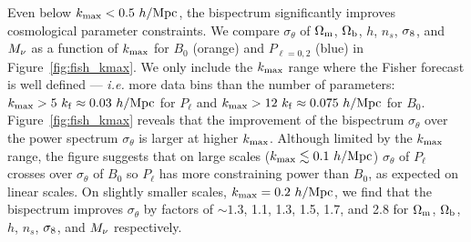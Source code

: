 Even below $k_{\rm max} < 0.5~h/{\rm Mpc}$, the bispectrum significantly 
improves cosmological parameter constraints. We compare $\sigma_\theta$ 
of $\Omega_{\rm m}$, $\Omega_{\rm b}$, $h$, $n_s$, $\sigma_8$, and $M_\nu$ as a function of $k_{\rm max}$ 
for $B_0$ (orange) and $P_{\ell = 0,2}$ (blue) in Figure~\ref{fig:fish_kmax}. We only 
include the $k_{\rm max}$ range where the Fisher forecast is well defined --- 
\emph{i.e.} more data bins than the number of parameters: $k_{\rm max} > 5~k_{\rm f} \approx 0.03~h/{\rm Mpc}$ 
for $P_\ell$ and $k_{\rm max} > 12~k_{\rm f} \approx 0.075~h/{\rm Mpc}$ for 
$B_0$. Figure~\ref{fig:fish_kmax} reveals that the improvement of the
bispectrum $\sigma_\theta$ over the power spectrum $\sigma_\theta$ is 
larger at higher $k_{\rm max}$. Although limited by the $k_{\rm max}$ range, 
the figure suggests that on large scales ($k_{\rm max}\lesssim 0.1~h/{\rm Mpc}$) 
$\sigma_\theta$ of $P_\ell$ crosses over $\sigma_\theta$ of $B_0$ so $P_\ell$ has more 
constraining power than $B_0$, as expected on linear scales. On slightly smaller 
scales, $k_{\rm max} = 0.2~h/{\rm Mpc}$, we find that the bispectrum improves 
$\sigma_\theta$ by factors of 
$\sim 1.3$, 1.1, 1.3, 1.5, 1.7, and 2.8 for $\Omega_{\rm m}$, $\Omega_{\rm b}$, $h$, $n_s$, $\sigma_8$, 
and $M_\nu$ respectively. 

